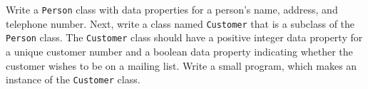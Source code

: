 \label{inheritance:customer}
Write a \texttt{Person} class with data properties for a person's name, address, and telephone number. Next, write a class named \texttt{Customer} that is a subclass of the \texttt{Person} class. The \texttt{Customer} class should have a positive integer data property for a unique customer number and a boolean data property indicating whether the customer wishes to be on a mailing list. Write a small program, which makes an instance of the \texttt{Customer} class.
